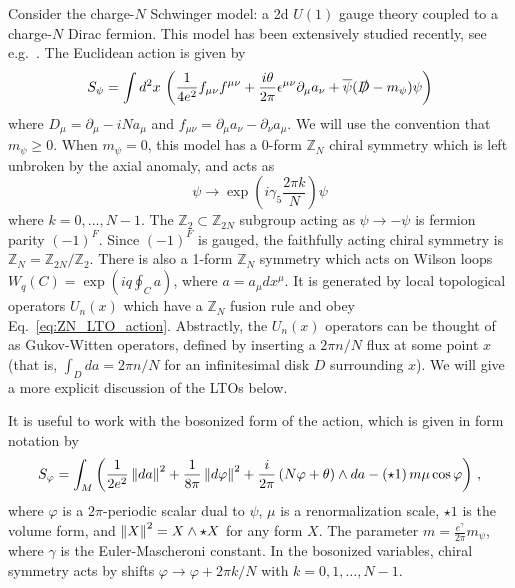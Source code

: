 \documentclass[11pt]{article}
\def\bar{\overline}
\def\del{{\partial}}
\def\g{{\gamma}}
\newcommand{\formabs}[1]{\left\Arrowvert #1 \right\Arrowvert}
\begin{document}
Consider the charge-$N$ Schwinger model: a 2d $U(1)$ gauge theory coupled to a charge-$N$ Dirac fermion. This model has been extensively studied recently, see e.g.~\cite{Anber:2018jdf,Armoni:2018bga,Misumi:2019dwq,Komargodski:2020mxz,Cherman:2020cvw,Honda:2021ovk}.  The Euclidean action is given by 
\begin{equation}
    S_{\psi}=\int d^2x \,\left( \frac{1}{4e^2}f_{\mu\nu}f^{\mu\nu}+\frac{i\theta}{2\pi}\epsilon^{\mu\nu}\del_\mu a_\nu+\bar{\psi} (\slashed{D} -m_\psi)\psi \right)
\end{equation}
where $D_{\mu} = \partial_{\mu} - i N a_{\mu}$ and $f_{\mu\nu}=\partial_\mu a_\nu - \partial_\nu a_\mu$. We will use the convention that $m_{\psi} \ge 0$.  When $m_{\psi} = 0$, this model has a 0-form $\mathbb{Z}_N$ chiral symmetry which is left unbroken by the axial anomaly, and acts as
\begin{equation}
    \psi\rightarrow \exp{\left(i\g_5 \frac{2\pi k}{N}\right)} \psi 
\end{equation}
where $k=0,\ldots,N-1$. The $\mathbb{Z}_2 \subset \mathbb{Z}_{2N}$ subgroup acting as $\psi \to -\psi$ is fermion parity $(-1)^F$.  Since $(-1)^F$ is gauged, the faithfully acting chiral symmetry is $\mathbb{Z}_N = \mathbb{Z}_{2N}/\mathbb{Z}_2$. There is also a 1-form $\mathbb{Z}_N$ symmetry which acts on Wilson loops $W_q(C) = \exp{\left(i q \oint_C a\right)}$, where $a = a_{\mu} dx^{\mu}$. It is generated by local topological operators $U_{n}(x)$ which have a $\mathbb{Z}_N$ fusion rule and obey Eq.~\eqref{eq:ZN_LTO_action}.  Abstractly, the $U_{n}(x)$ operators can be thought of as Gukov-Witten operators, defined by inserting a $2\pi n/N$ flux at some point $x$ (that is, $\int_D da = 2\pi n/N$ for an infinitesimal disk $D$ surrounding $x$).  We will give a more explicit discussion of the LTOs below.

It is useful to work with the bosonized form of the action, which is given in form notation by 
\begin{equation}
    S_{\varphi}=\int_{M} \left(\frac{1}{2e^2} \formabs{da}^2+\frac{1}{8\pi}\formabs{d\varphi}^2+\frac{i}{2\pi} \left(N \varphi + \theta \right)\wedge da -  ( \star 1 ) \, m\mu\cos\varphi  \right)\,,
    \label{eq:bosonized_action}
\end{equation}
where $\varphi$ is a $2\pi$-periodic scalar dual to $\psi$, $\mu$ is a renormalization scale, $\star 1$ is the volume form, and $\formabs{X}^2 = X\wedge \star X $ for any form $X$. The parameter $m = \frac{e^\gamma}{2\pi}m_\psi$, where $\gamma$ is the Euler-Mascheroni constant. In the bosonized variables,  chiral symmetry acts by shifts $\varphi\rightarrow\varphi+2\pi k/N$ with $k=0,1,\dots,N-1$.
\end{document}

